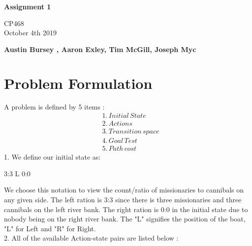 \documentclass{article}
\begin{document}
\begin{titlepage}
  \pagestyle{fancy}
  \thispagestyle{fancy}
   \begin{center}
       \vspace*{1cm}
 
      \Huge
       \textbf{Assignment 1}
 
       \vspace{0.5cm}
       \Large
        CP468 \\ October 4th 2019
 
       \vspace{1.5cm}
 
       \textbf{Austin Bursey , Aaron Exley, Tim McGill, Joseph Myc}
 
       \vfill

 
       \vspace{0.8cm}
 
   \end{center}
\end{titlepage}
\setcounter{page}{2}
\section{Problem Formulation}
A problem is defined by 5 items : \\
\begin{align*}
&1.\, Initial\, State\\
&2.\, Actions\\
&3.\, Transition\, space \\
&4.\, Goal\,Test\\
&5.\, Path\, cost
\end{align*}	
1. We define our initial state as:  \\
\begin{center}
3:3 L 0:0\\
\end{center}

We choose this notation to view the count/ratio of missionaries to cannibals on any given side. The left ration is 3:3 since there is three missionaries and three cannibals on the left river bank. The right ration is 0:0 in the initial state due to nobody being on the right river bank. The "L" signifies the position of the boat, "L" for Left and "R" for Right.\\

2. All of the available Action-state pairs are listed below : 
\end{document}
